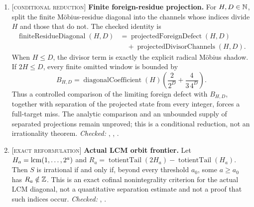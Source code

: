 \documentclass[11pt]{article}
\newcommand{\Stot}{S}
\newcommand{\stag}[1]{{\normalfont\footnotesize\textsc{[#1]}}}
\begin{document}
{\begin{enumerate}[label=\textbf{R\arabic*.},ref=R\arabic*,leftmargin=2.4em,
  itemsep=0.2em,topsep=0.25em]
\item\label{res:foreignresidue} \stag{conditional reduction}
\textbf{Finite foreign-residue projection.}  For $H,D\in\mathbb{N}$, split the
finite Möbius-residue diagonal into the channels whose indices divide $H$ and
those that do not.  The checked identity is
\[
 \begin{aligned}
 \operatorname{finiteResidueDiagonal}(H,D)
   &=\operatorname{projectedForeignDefect}(H,D)\\
   &\quad+\operatorname{projectedDivisorChannels}(H,D).
 \end{aligned}
\]
When $H\le D$, the divisor term is exactly the explicit radical Möbius
shadow.  If $2H\le D$, every finite omitted window is bounded by
\[
 B_{H,D}=\operatorname{diagonalCoefficient}(H)\left(
       \frac{2}{2^D}+\frac{4}{3\,4^D}\right).
\]
Thus a controlled comparison of the limiting foreign defect with $B_{H,D}$,
together with separation of the projected state from every integer, forces a
full-target miss.  The analytic comparison and an unbounded supply of
separated projections remain unproved; this is a conditional reduction, not
an irrationality theorem.
{\footnotesize\emph{Checked:}
,
,
.}

\item\label{res:actualorbit} \stag{exact reformulation}
\textbf{Actual LCM orbit frontier.}  Let
$H_a=\operatorname{lcm}(1,\ldots,2^a)$ and
$R_a=\operatorname{totientTail}(2H_a)-\operatorname{totientTail}(H_a)$.
Then $\Stot$ is irrational if and only if, beyond every threshold $a_0$,
some $a\ge a_0$ has $R_a\notin\mathbb{Z}$.  This is an exact cofinal
nonintegrality criterion for the actual LCM diagonal, not a quantitative
separation estimate and not a proof that such indices occur.
{\footnotesize\emph{Checked:}
,
.}


\end{enumerate}}
\end{document}
